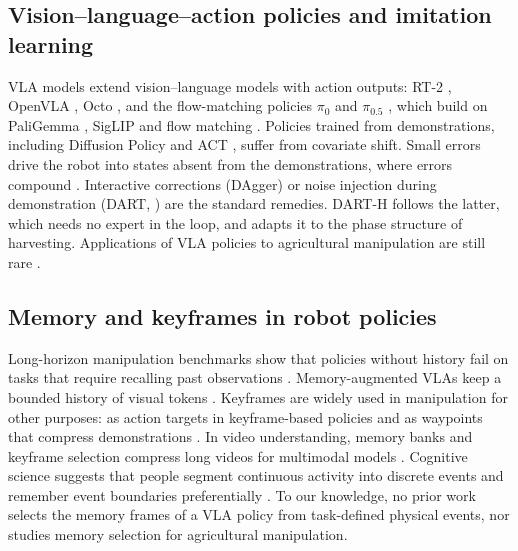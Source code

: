 \subsection{Vision--language--action policies and imitation learning}
VLA models extend vision--language models with action outputs: RT-2 \citep{brohan2023rt2}, OpenVLA \citep{kim2024openvla}, Octo \citep{octo2024}, and the flow-matching policies $\pi_0$ and $\pi_{0.5}$ \citep{black2024pi0,pi05_2025}, which build on PaliGemma \citep{beyer2024paligemma}, SigLIP \citep{zhai2023siglip} and flow matching \citep{lipman2023flow}. Policies trained from demonstrations, including Diffusion Policy \citep{chi2023diffusion} and ACT \citep{zhao2023act}, suffer from covariate shift. Small errors drive the robot into states absent from the demonstrations, where errors compound \citep{ross2011dagger}. Interactive corrections (DAgger) or noise injection during demonstration (DART, \citealp{laskey2017dart}) are the standard remedies. DART-H follows the latter, which needs no expert in the loop, and adapts it to the phase structure of harvesting. Applications of VLA policies to agricultural manipulation are still rare .

\subsection{Memory and keyframes in robot policies}
Long-horizon manipulation benchmarks show that policies without history fail on tasks that require recalling past observations . Memory-augmented VLAs keep a bounded history of visual tokens . Keyframes are widely used in manipulation for other purposes: as action targets in keyframe-based policies \citep{shridhar2022peract} and as waypoints that compress demonstrations \citep{shi2023awe}. In video understanding, memory banks and keyframe selection compress long videos for multimodal models \citep{he2024malmm}. Cognitive science suggests that people segment continuous activity into discrete events and remember event boundaries preferentially \citep{zacks2007event}. To our knowledge, no prior work selects the memory frames of a VLA policy from task-defined physical events, nor studies memory selection for agricultural manipulation.

